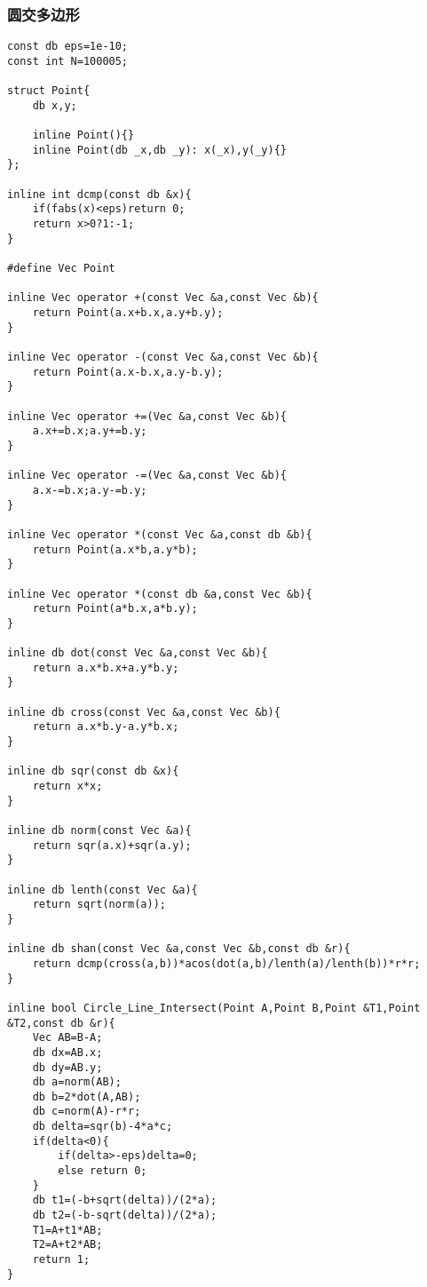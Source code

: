 \documentclass{ctexart}
\begin{document}
\subsubsection{圆交多边形}
\begin{lstlisting}
const db eps=1e-10;
const int N=100005;

struct Point{
    db x,y;

    inline Point(){}
    inline Point(db _x,db _y): x(_x),y(_y){}
};

inline int dcmp(const db &x){
    if(fabs(x)<eps)return 0;
    return x>0?1:-1;
}

#define Vec Point

inline Vec operator +(const Vec &a,const Vec &b){
    return Point(a.x+b.x,a.y+b.y);
}

inline Vec operator -(const Vec &a,const Vec &b){
    return Point(a.x-b.x,a.y-b.y);
}

inline Vec operator +=(Vec &a,const Vec &b){
    a.x+=b.x;a.y+=b.y;
}

inline Vec operator -=(Vec &a,const Vec &b){
    a.x-=b.x;a.y-=b.y;
}

inline Vec operator *(const Vec &a,const db &b){
    return Point(a.x*b,a.y*b);
}

inline Vec operator *(const db &a,const Vec &b){
    return Point(a*b.x,a*b.y);
}

inline db dot(const Vec &a,const Vec &b){
    return a.x*b.x+a.y*b.y;
}

inline db cross(const Vec &a,const Vec &b){
    return a.x*b.y-a.y*b.x;
}

inline db sqr(const db &x){
    return x*x;
}

inline db norm(const Vec &a){
    return sqr(a.x)+sqr(a.y);
}

inline db lenth(const Vec &a){
    return sqrt(norm(a));
}

inline db shan(const Vec &a,const Vec &b,const db &r){
    return dcmp(cross(a,b))*acos(dot(a,b)/lenth(a)/lenth(b))*r*r;
}

inline bool Circle_Line_Intersect(Point A,Point B,Point &T1,Point &T2,const db &r){
    Vec AB=B-A;
    db dx=AB.x;
    db dy=AB.y;
    db a=norm(AB);
    db b=2*dot(A,AB);
    db c=norm(A)-r*r;
    db delta=sqr(b)-4*a*c;
    if(delta<0){
        if(delta>-eps)delta=0;
        else return 0;
    }
    db t1=(-b+sqrt(delta))/(2*a);
    db t2=(-b-sqrt(delta))/(2*a);
    T1=A+t1*AB;
    T2=A+t2*AB;
    return 1;
}


\end{lstlisting}
\end{document}
